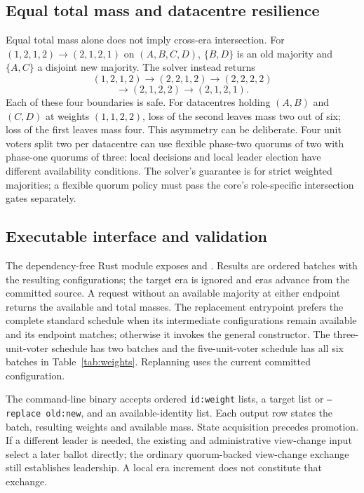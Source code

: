\documentclass[10pt,journal,letterpaper]{IEEEtran}
\newcommand{\code}[1]{\texttt{#1}}
\begin{document}
\subsection{Equal total mass and datacentre resilience}
Equal total mass alone does not imply cross-era intersection. For $(1,2,1,2)\to(2,1,2,1)$ on $(A,B,C,D)$, $\{B,D\}$ is an old majority and $\{A,C\}$ a disjoint new majority. The solver instead returns
\[
(1,2,1,2)\to(2,2,1,2)\to(2,2,2,2)
\]
\[
\to(2,1,2,2)\to(2,1,2,1).
\]
Each of these four boundaries is safe. For datacentres holding $(A,B)$ and $(C,D)$ at weights $(1,1,2,2)$, loss of the second leaves mass two out of six; loss of the first leaves mass four. This asymmetry can be deliberate. Four unit voters split two per datacentre can use flexible phase-two quorums of two with phase-one quorums of three: local decisions and local leader election have different availability conditions. The solver's guarantee is for strict weighted majorities; a flexible quorum policy must pass the core's role-specific intersection gates separately.

\subsection{Executable interface and validation}
The dependency-free Rust module  exposes  and . Results are ordered  batches with the resulting configurations; the target era is ignored and eras advance from the committed source. A request without an available majority at either endpoint returns the available and total masses. The replacement entrypoint prefers the complete standard schedule when its intermediate configurations remain available and its endpoint matches; otherwise it invokes the general constructor. The three-unit-voter schedule has two batches and the five-unit-voter schedule has all six batches in Table~\ref{tab:weights}. Replanning uses the current committed configuration.

The command-line binary  accepts ordered \code{id:weight} lists, a target list or \code{--replace old:new}, and an available-identity list. Each output row states the batch, resulting weights and available mass. State acquisition precedes promotion. If a different leader is needed, the existing  and administrative view-change input select a later ballot directly; the ordinary quorum-backed view-change exchange still establishes leadership. A local era increment does not constitute that exchange.
\end{document}
